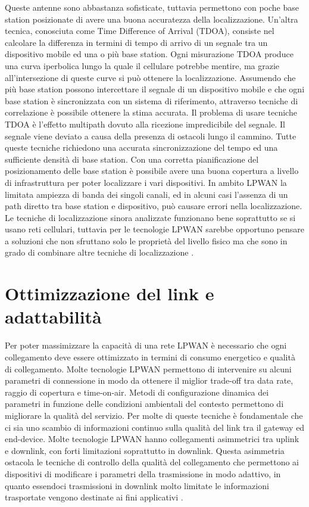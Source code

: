 \documentclass[12pt,a4paper,openright,twoside]{report}
\begin{document}
Queste antenne sono abbastanza sofisticate, tuttavia permettono con poche base station posizionate di avere una buona accuratezza della localizzazione. 
Un'altra tecnica, conosciuta come Time Difference of Arrival (TDOA), consiste nel calcolare la differenza in termini di tempo di arrivo di un segnale tra un dispositivo mobile ed una o pi\`u base station. Ogni misurazione TDOA produce una curva iperbolica lungo la quale il cellulare potrebbe mentire, ma grazie all'intersezione di queste curve si pu\`o ottenere la localizzazione. Assumendo che pi\`u base station possono intercettare il segnale di un dispositivo mobile e che ogni base station \`e sincronizzata con un sistema di riferimento, attraverso tecniche di correlazione \`e possibile ottenere la stima accurata.
Il problema di usare tecniche TDOA \`e l'effetto multipath dovuto alla ricezione impredicibile del segnale. Il segnale viene deviato a causa della presenza di ostacoli lungo il cammino.  
Tutte queste tecniche richiedono una accurata sincronizzazione del tempo ed una sufficiente densit\`a di base station. Con una corretta pianificazione del posizionamento delle base station \`e possibile avere una buona copertura a livello di infrastruttura per poter localizzare i vari dispositivi.
In ambito LPWAN la limitata ampiezza di banda dei singoli canali, ed in alcuni casi l'assenza di un path diretto tra base station e dispositivo, pu\`o causare errori nella localizzazione. 
Le tecniche di localizzazione sinora analizzate funzionano bene soprattutto se si usano reti cellulari, tuttavia per le tecnologie LPWAN sarebbe opportuno pensare a soluzioni che non sfruttano solo le propriet\`a del livello fisico ma che sono in grado di combinare altre tecniche di localizzazione \cite{K17}. 

\section{Ottimizzazione del link e adattabilit\`a}
Per poter massimizzare la capacit\`a di una rete LPWAN \`e necessario che ogni collegamento deve essere ottimizzato in termini di consumo energetico e qualit\`a di collegamento. 
Molte tecnologie LPWAN permettono di intervenire su alcuni parametri di connessione in modo da ottenere il miglior trade-off tra data rate, raggio di copertura e time-on-air.   
Metodi di configurazione dinamica dei parametri in funzione delle condizioni ambientali del contesto permettono di migliorare la qualit\`a del servizio. Per molte di queste tecniche \`e fondamentale che ci sia uno scambio di informazioni continuo sulla qualit\`a del link tra il gateway ed end-device. 
Molte tecnologie LPWAN hanno collegamenti asimmetrici tra uplink e downlink, con forti limitazioni soprattutto in downlink. Questa asimmetria ostacola le tecniche di controllo della qualit\`a del collegamento che permettono ai dispositivi di modificare i parametri della trasmissione in modo adattivo, in quanto essendoci trasmissioni in downlink molto limitate le informazioni trasportate vengono destinate ai fini applicativi \cite{K2}.  
\end{document}
